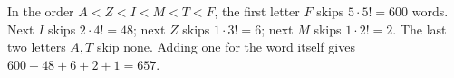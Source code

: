 In the order $A<Z<I<M<T<F$, the first letter $F$ skips $5\cdot5!=600$ words. Next $I$ skips $2\cdot4!=48$; next $Z$ skips $1\cdot3!=6$; next $M$ skips $1\cdot2!=2$. The last two letters $A,T$ skip none. Adding one for the word itself gives $600+48+6+2+1=\boxed{657}$.
